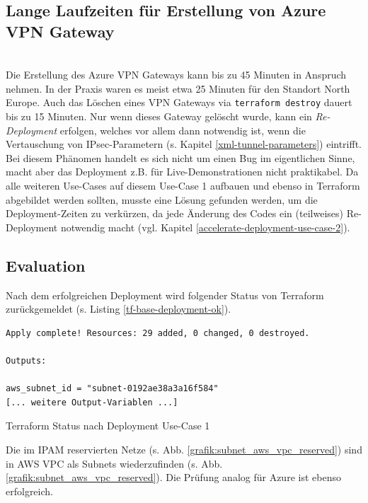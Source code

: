 \subsection{Lange Laufzeiten für Erstellung von Azure VPN Gateway}\label{azure-deployment-time}\\
Die Erstellung des Azure VPN Gateways kann bis zu 45 Minuten in Anspruch nehmen\cite{azurevpndeployment2021}. In der Praxis waren es meist etwa 25 Minuten für den Standort \glqq North Europe\grqq{}. Auch das Löschen eines VPN Gateways via \texttt{terraform destroy} dauert bis zu 15 Minuten. Nur wenn dieses Gateway gelöscht wurde, kann ein \textit{Re-\gls{Deployment}} erfolgen, welches vor allem dann notwendig ist, wenn die Vertauschung von IPsec-Parametern (s. Kapitel \ref{xml-tunnel-parameters}) eintrifft.\\
Bei diesem Phänomen handelt es sich nicht um einen Bug im eigentlichen Sinne, macht aber das \gls{Deployment} z.B. für Live-Demonstrationen nicht praktikabel. Da alle weiteren Use-Cases auf diesem Use-Case 1 aufbauen und ebenso in Terraform abgebildet werden sollten, musste eine Lösung gefunden werden, um die \gls{Deployment}-Zeiten zu verkürzen, da jede Änderung des Codes ein (teilweises) Re-\gls{Deployment} notwendig macht (vgl. Kapitel \ref{accelerate-deployment-use-case-2}).

\subsection{Evaluation}
Nach dem erfolgreichen \gls{Deployment} wird folgender Status von Terraform zurückgemeldet (s. Listing \ref{tf-base-deployment-ok}).
\begin{listing}[h]
\begin{verbatim}
Apply complete! Resources: 29 added, 0 changed, 0 destroyed.

Outputs:

aws_subnet_id = "subnet-0192ae38a3a16f584"
[... weitere Output-Variablen ...]
\end{verbatim}
\caption{Terraform Status nach \gls{Deployment} Use-Case 1}
\label{tf-base-deployment-ok}
\end{listing}\FloatBarrier
Die im IPAM reservierten Netze (s. Abb. \ref{grafik:subnet_aws_vpc_reserved}) sind in AWS VPC als Subnets wiederzufinden (s. Abb. \ref{grafik:subnet_aws_vpc_reserved}). Die Prüfung analog für Azure ist ebenso erfolgreich.

